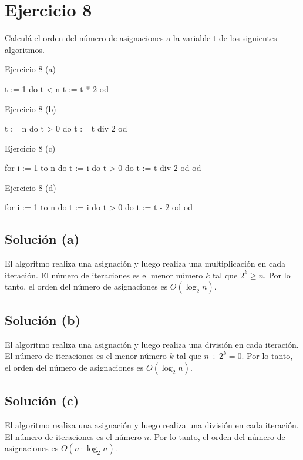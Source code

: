 \section{Ejercicio 8}
Calculá el orden del número de asignaciones a la variable t de los siguientes algoritmos.

\begin{codebox}{Ejercicio 8 (a)}
\begin{pascallike}
t := 1
do t < n 
    t := t * 2
od
\end{pascallike}
\end{codebox}

\begin{codebox}{Ejercicio 8 (b)}
\begin{pascallike}
t := n
do t > 0 do
    t := t div 2
od
\end{pascallike}
\end{codebox}

\begin{codebox}{Ejercicio 8 (c)}
\begin{pascallike}
for i := 1 to n do
    t := i
    do t > 0 do
    t := t div 2
    od
od
\end{pascallike} 
\end{codebox}

\begin{codebox}{Ejercicio 8 (d)}
\begin{pascallike}
for i := 1 to n do
    t := i
    do t > 0 do
    t := t - 2
    od
od
\end{pascallike}
\end{codebox}

\subsection{Solución (a)}
El algoritmo realiza una asignación y luego realiza una multiplicación en cada iteración. El número de iteraciones es el menor número $k$ tal que $2^k \geq n$. Por lo tanto, el orden del número de asignaciones es $O(\log_2 n)$.

\subsection{Solución (b)}
El algoritmo realiza una asignación y luego realiza una división en cada iteración. El número de iteraciones es el menor número $k$ tal que $n \div 2^k = 0$. Por lo tanto, el orden del número de asignaciones es $O(\log_2 n)$.

\subsection{Solución (c)}
El algoritmo realiza una asignación y luego realiza una división en cada iteración. El número de iteraciones es el número $n$. Por lo tanto, el orden del número de asignaciones es $O(n \cdot \log_2 n)$.

